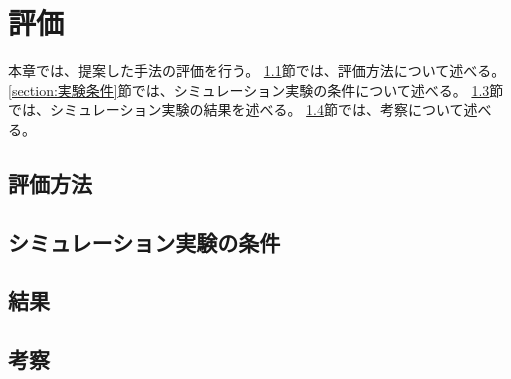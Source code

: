 \chapter{評価} \label{chapter:evaluate}
本章では、提案した手法の評価を行う。
\ref{section:評価方法}節では、評価方法について述べる。
\ref{section:実験条件}節では、シミュレーション実験の条件について述べる。
\ref{section:結果}節では、シミュレーション実験の結果を述べる。
\ref{section:考察}節では、考察について述べる。


\section{評価方法} \label{section:評価方法}


\section{シミュレーション実験の条件} \label{section:実験の条件}


\section{結果} \label{section:結果}


\section{考察} \label{section:考察}
